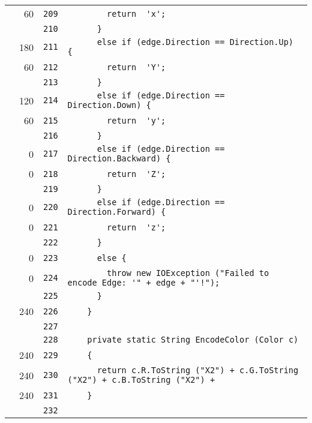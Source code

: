 \documentclass[a4paper,10pt]{article}
\begin{document}
\begin{longtable}[l]{lrrl}
\cellcolor{green} & 60 & \verb~209~ & \verb~        return  'x';~\\
\cellcolor{gray} &  & \verb~210~ & \verb~      }~\\
\cellcolor{green} & 180 & \verb~211~ & \verb~      else if (edge.Direction == Direction.Up) {~\\
\cellcolor{green} & 60 & \verb~212~ & \verb~        return  'Y';~\\
\cellcolor{gray} &  & \verb~213~ & \verb~      }~\\
\cellcolor{green} & 120 & \verb~214~ & \verb~      else if (edge.Direction == Direction.Down) {~\\
\cellcolor{green} & 60 & \verb~215~ & \verb~        return  'y';~\\
\cellcolor{gray} &  & \verb~216~ & \verb~      }~\\
\cellcolor{red} & 0 & \verb~217~ & \verb~      else if (edge.Direction == Direction.Backward) {~\\
\cellcolor{red} & 0 & \verb~218~ & \verb~        return  'Z';~\\
\cellcolor{gray} &  & \verb~219~ & \verb~      }~\\
\cellcolor{red} & 0 & \verb~220~ & \verb~      else if (edge.Direction == Direction.Forward) {~\\
\cellcolor{red} & 0 & \verb~221~ & \verb~        return  'z';~\\
\cellcolor{gray} &  & \verb~222~ & \verb~      }~\\
\cellcolor{red} & 0 & \verb~223~ & \verb~      else {~\\
\cellcolor{red} & 0 & \verb~224~ & \verb~        throw new IOException ("Failed to encode Edge: '" + edge + "'!");~\\
\cellcolor{gray} &  & \verb~225~ & \verb~      }~\\
\cellcolor{green} & 240 & \verb~226~ & \verb~    }~\\
\cellcolor{gray} &  & \verb~227~ & \verb~~\\
\cellcolor{gray} &  & \verb~228~ & \verb~    private static String EncodeColor (Color c)~\\
\cellcolor{green} & 240 & \verb~229~ & \verb~    {~\\
\cellcolor{green} & 240 & \verb~230~ & \verb~      return c.R.ToString ("X2") + c.G.ToString ("X2") + c.B.ToString ("X2") +~\\
\cellcolor{green} & 240 & \verb~231~ & \verb~    }~\\
\cellcolor{gray} &  & \verb~232~ & \verb~~\\

\end{longtable}
\end{document}
